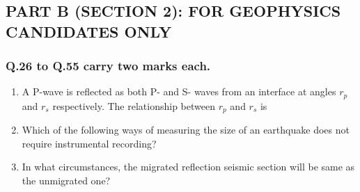 \documentclass[journal,12pt,onecolumn]{IEEEtran}
\theoremstyle{remark}
\begin{document}
\begin{enumerate}
\begin{center}
    \subsection*{PART B (SECTION 2): FOR GEOPHYSICS CANDIDATES ONLY }    
\end{center}
\end{enumerate}
\subsubsection*{Q.26 to Q.55 carry two marks each. }
        \begin{enumerate}[start = 26 ]
           
        \item A P-wave is reflected as both P- and S- waves from an interface at angles $r_p$ and $r_s$ respectively. The relationship between $r_p$ and $r_s$ is \hfill{}
            \begin{enumerate}
            \end{enumerate}

        \item Which of the following ways of measuring the size of an earthquake does not require instrumental recording? \hfill{}
            \begin{enumerate}
            \end{enumerate}

        \item In what circumstances, the migrated reflection seismic section will be same as the unmigrated one? \hfill{}
            \begin{enumerate}
            \end{enumerate}


\end{enumerate}
\end{document}
